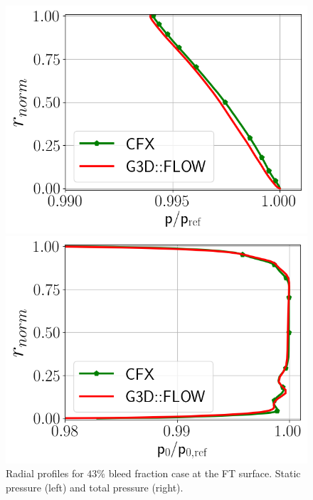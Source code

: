 \begin{figure}[h!]
  \centering
  \begin{minipage}{0.48\columnwidth}
  \includegraphics[width=1.\textwidth]{figures/PAaveB40_FT.png}
  \end{minipage}
  \begin{minipage}{0.48\columnwidth}
  \includegraphics[width=1.\textwidth]{figures/P0MaveB40_FT.png}
  \end{minipage}
  \caption{Radial profiles for $43\%$ bleed fraction case at the FT surface. Static pressure (left) and total pressure (right).} \label{fig:FT40}
\end{figure}

